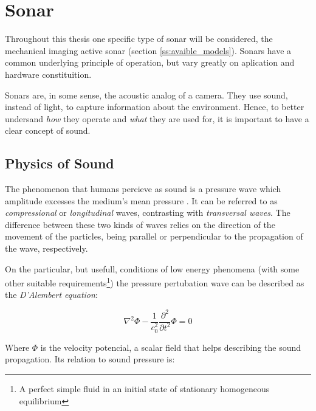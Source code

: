 \section{Sonar}


Throughout this thesis one specific type of sonar will be considered, the
mechanical imaging active sonar (section \ref{ss:avaible_models}). Sonars have a common
underlying principle of operation, but vary greatly on aplication and hardware constituition.


Sonars are, in some sense, the acoustic analog of a camera. They use sound,
instead of light, to capture information about the environment. Hence, to better
undersand \textit{how} they operate and \textit{what} they are used for, it is
important to have a clear concept of sound.

\subsection{Physics of Sound}

The phenomenon that humans percieve as sound is a pressure wave which
amplitude excesses the medium's mean pressure \cite{FEYNMAN}. It can be
referred to as \textit{compressional} or \textit{longitudinal} waves, contrasting with
\textit{transversal waves}. The difference between these two kinds of waves
relies on the direction of the movement of the particles, being parallel or
perpendicular to the propagation of the wave, respectively\cite{BRUNEAU}.

On the particular, but usefull, conditions of low energy
phenomena\cite{Lefebvre} (with some other suitable requirements\footnote{A
perfect simple fluid in an initial state of stationary homogeneous equilibrium})
the pressure pertubation wave can be described as the \textit{D'Alembert
equation}:
 
\begin{equation}\label{eq:lambert}
\nabla^2 \Phi - \frac{1}{c^2_0}\frac{\partial^2}{\partial t^2} \Phi = 0
\end{equation}

Where $\Phi$ is the velocity potencial, a scalar field that helps describing the
sound propagation. Its relation to sound pressure is:

